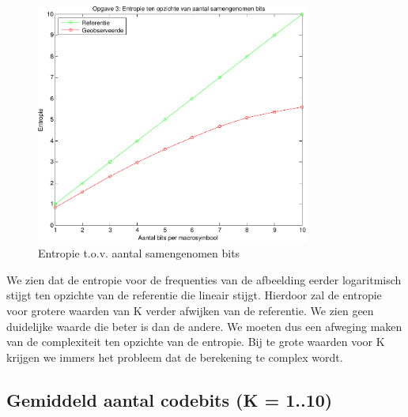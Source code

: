 \documentclass[11pt,a4paper]{article}
\begin{document}
\begin{figure}[h!]
  		\centering
   		\includegraphics[width=0.8\textwidth]{1_3_entropie.pdf}
   		\caption{Entropie t.o.v. aantal samengenomen bits}
  		\label{fig:1.3_entropie}
\end{figure}

We zien dat de entropie voor de frequenties van de afbeelding eerder logaritmisch stijgt ten opzichte van de referentie die lineair stijgt. Hierdoor zal de entropie voor grotere waarden van K verder afwijken van de referentie. We zien geen duidelijke waarde die beter is dan de andere. We moeten dus een afweging maken van de complexiteit ten opzichte van de entropie. Bij te grote waarden voor K krijgen we immers het probleem dat de berekening te complex wordt.  

\subsection{Gemiddeld aantal codebits (K = 1..10)}
\end{document}
